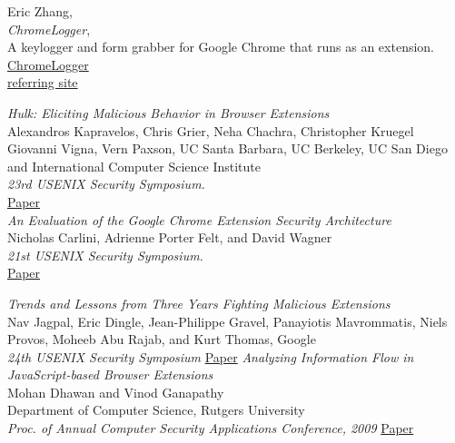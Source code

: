 \documentclass[12pt]{article}
\begin{document}
\begin{multicols}{2}
\begin{thebibliography}{8}
	Eric Zhang,\\
	\emph{ChromeLogger},\\
A keylogger and form grabber for Google Chrome that runs as an extension.\\
\href{https://github.com/Xeroday/ChromeLogger}{ChromeLogger}\\
\href{https://www.ericzhang.me/projects/chromelogger/}{referring site}

\emph{Hulk: Eliciting Malicious Behavior in Browser Extensions}\\
Alexandros Kapravelos, Chris Grier, Neha Chachra, Christopher Kruegel
Giovanni Vigna, Vern Paxson,
UC Santa Barbara,
UC Berkeley, 
UC San Diego and 
International Computer Science Institute\\
\emph{23rd USENIX Security Symposium.}\\
\href{https://www.usenix.org/system/files/conference/usenixsecurity14/sec14-paper-kapravelos.pdf}{Paper}\\

\emph{An Evaluation of the Google Chrome Extension Security Architecture}\\
Nicholas Carlini, Adrienne Porter Felt, and David Wagner\\
\emph{21st USENIX Security Symposium.}\\
\href{https://www.usenix.org/system/files/conference/usenixsecurity12/sec12-final177_0.pdf}{Paper}

\emph{Trends and Lessons from Three Years Fighting
	Malicious Extensions}\\
Nav Jagpal, Eric Dingle, Jean-Philippe Gravel, Panayiotis Mavrommatis,
Niels Provos, Moheeb Abu Rajab, and Kurt Thomas, Google\\
\emph{24th USENIX Security Symposium}
\href{https://www.usenix.org/system/files/conference/usenixsecurity15/sec15-paper-jagpal.pdf}{Paper}
\emph{Analyzing Information Flow in JavaScript-based Browser Extensions}\\
Mohan Dhawan and Vinod Ganapathy\\
Department of Computer Science, Rutgers University\\
\emph{Proc. of Annual
	Computer Security Applications Conference, 2009}
\href{https://www.acsac.org/2009/openconf/modules/request.php?module=oc_program&action=view.php&id=10}{Paper}
\end{thebibliography}
\end{multicols}
 
\end{document}
